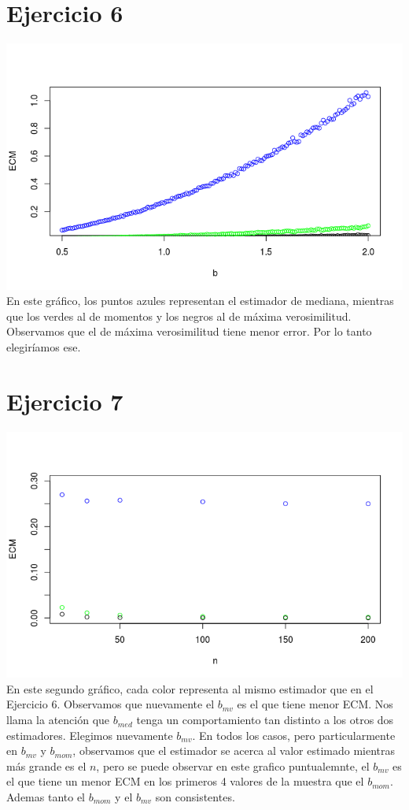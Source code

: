 \documentclass{article}
\begin{document}
\section{Ejercicio 6}
\includegraphics[scale=0.75]{ej6.png}
En este gráfico, los puntos azules representan el estimador de mediana, mientras que los verdes al de momentos y los negros al de máxima verosimilitud.
Observamos que el de máxima verosimilitud tiene menor error. Por lo tanto elegiríamos ese.

\section{Ejercicio 7}
\includegraphics[scale=0.75]{ej7.png}
En este segundo gráfico, cada color representa al mismo estimador que en el Ejercicio 6.
Observamos que nuevamente el $b_{mv}$ es el que tiene menor ECM. Nos llama la atención que $b_{med}$ tenga un comportamiento tan distinto a los otros dos estimadores. Elegimos nuevamente $b_{mv}$. En todos los casos, pero particularmente en $b_{mv}$ y $b_{mom}$, observamos que el estimador se acerca al valor estimado mientras más grande es el $n$, pero se puede observar en este grafico puntualemnte, el $b_{mv}$ es el que tiene un menor ECM en los primeros 4 valores de la muestra que el $b_{mom}$. Ademas tanto el $b_{mom}$ y el $b_{mv}$ son consistentes.
\end{document}
